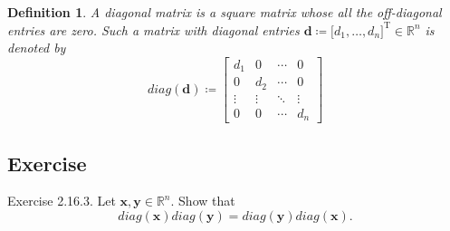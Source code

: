 \documentclass{article}
\theoremstyle{plain}
\newtheorem{dfn}{Definition}[subsection]
\begin{document}
\begin{dfn}
	A diagonal matrix is a square matrix whose all the off-diagonal entries are zero.
	Such a matrix with diagonal entries $\bm{d} \coloneq \lbrack d_1 , \ldots , d_n \rbrack^\mathrm{T} \in \mathbb{R}^n$
	is denoted by
	\begin{equation*}
		diag(\bm{d}) \coloneq
		\begin{bmatrix}
			d_1 & 0 & \cdots & 0 \\
			0 & d_2 & \cdots & 0 \\
			\vdots & \vdots & \ddots & \vdots \\
			0 & 0 & \cdots & d_n
		\end{bmatrix}
	\end{equation*}
\end{dfn}


\subsection{Exercise}

\begin{itembox}[l]{Exercise 2.16.3.}
	Let
	\begin{math}
		\bm{x} , \bm{y} \in \mathbb{R}^n .
	\end{math}
	Show that
	\begin{equation}
		\label{ex2163}
		diag(\bm{x}) diag(\bm{y}) = diag(\bm{y}) diag(\bm{x}) .
	\end{equation}
\end{itembox}
\end{document}
